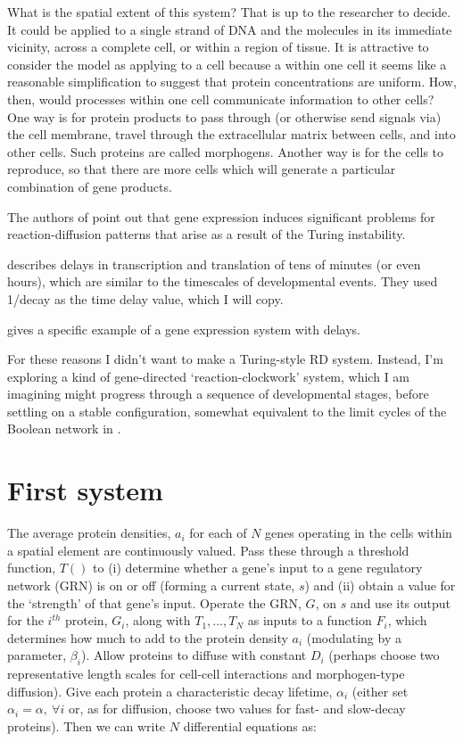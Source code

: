\documentclass[11pt, a4paper]{article}
\begin{document}
What is the spatial extent of this system? That is up to the researcher to
decide. It could be applied to a single strand of DNA and the molecules in its
immediate vicinity, across a complete cell, or within a region of tissue. It
is attractive to consider the model as applying to a cell because a within one
cell it seems like a reasonable simplification to suggest that protein
concentrations are uniform. How, then, would processes within one cell
communicate information to other cells? One way is for protein products to
pass through (or otherwise send signals via) the cell membrane, travel through
the extracellular matrix between cells, and into other cells. Such proteins
are called morphogens. Another way is for the cells to reproduce, so that
there are more cells which will generate a particular combination of gene
products.

The authors of \cite{seirinlee_aberrant_2010} point out that gene expression
induces significant problems for reaction-diffusion patterns that arise as a
result of the Turing instability.

\cite{gaffney_gene_2006} describes delays in transcription and translation of
tens of minutes (or even hours), which are similar to the timescales of
developmental events. They used 1/decay as the time delay value, which I will
copy.

\cite{monk_oscillatory_2003} gives a specific example of a gene expression
system with delays.

For these reasons I didn't want to make a Turing-style RD system. Instead, I'm
exploring a kind of gene-directed `reaction-clockwork' system, which I am
imagining might progress through a sequence of developmental stages, before
settling on a stable configuration, somewhat equivalent to the limit cycles of
the Boolean network in \cite{wilson_limit_2019}.

\section{First system}

The average protein densities, $a_i$ for each of $N$ genes operating in the
cells within a spatial element are continuously valued. Pass these through a
threshold function, $T()$ to (i) determine whether a gene's input to a
gene regulatory network (GRN) is on or off (forming a current state, $s$) and
(ii) obtain a value for the `strength' of that gene's input. Operate the GRN,
$G$, on $s$ and use its output for the $i^{th}$ protein, $G_i$, along with
$T_1,...,T_N$ as inputs to a function $F_i$, which determines how much
to add to the protein density $a_i$ (modulating by a parameter, $\beta_i$). Allow
proteins to diffuse with constant $D_i$ (perhaps choose two representative
length scales for cell-cell interactions and morphogen-type diffusion). Give
each protein a characteristic decay lifetime, $\alpha_i$ (either set
%
$\alpha_i = \alpha,~\forall i$ or, as for diffusion, choose two values for
fast- and slow-decay proteins). Then we can write $N$ differential equations as:
\end{document}
